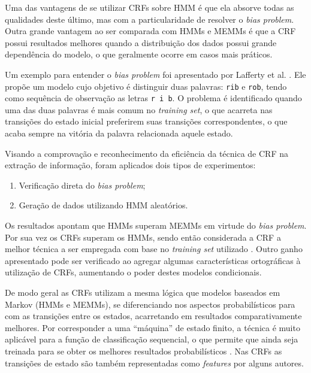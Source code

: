 Uma das vantagens de se utilizar CRFs sobre HMM é que ela absorve todas as qualidades deste último, mas com a particularidade de resolver o \textit{bias problem}. Outra grande vantagem ao ser comparada com HMMs e MEMMs é que a CRF possui resultados melhores quando a distribuição dos dados possui grande dependência do modelo, o que geralmente ocorre em casos mais práticos.

Um exemplo para entender o \textit{bias problem} foi apresentado por Lafferty et al. \cite{Lafferty-CRF}. Ele propõe um modelo cujo objetivo é distinguir duas palavras: \texttt{rib} e \texttt{rob}, tendo como sequência de observação as letras \texttt{r i b}. O problema é identificado quando uma das duas palavras é mais comum no \textit{training set}, o que acarreta nas transições do estado inicial preferirem suas transições correspondentes, o que acaba sempre na vitória da palavra relacionada aquele estado.

Visando a comprovação e reconhecimento da eficiência da técnica de CRF na extração de informação, foram aplicados dois tipos de experimentos:

\begin{enumerate}
    \item Verificação direta do \textit{bias problem};
    \item Geração de dados utilizando HMM aleatórios.
\end{enumerate}

Os resultados apontam que HMMs superam MEMMs em virtude do \textit{bias problem}. Por sua vez os CRFs superam os HMMs, sendo então considerada a CRF a melhor técnica a ser empregada com base no \textit{training set} utilizado \cite{Lafferty-CRF}. Outro ganho apresentado pode ser verificado ao agregar algumas características ortográficas à utilização de CRFs, aumentando o poder destes modelos condicionais.

De modo geral as CRFs utilizam a mesma lógica que modelos baseados em Markov (HMMs e MEMMs), se diferenciando nos aspectos probabilísticos para com as transições entre os estados, acarretando em resultados comparativamente melhores. Por corresponder a uma ``máquina'' de estado finito, a técnica é muito aplicável para a função de classificação sequencial, o que permite que ainda seja treinada para se obter os melhores resultados probabilísticos \cite{Peng-CRF-IE}. Nas CRFs as transições de estado são também representadas como \emph{features} por alguns autores.


